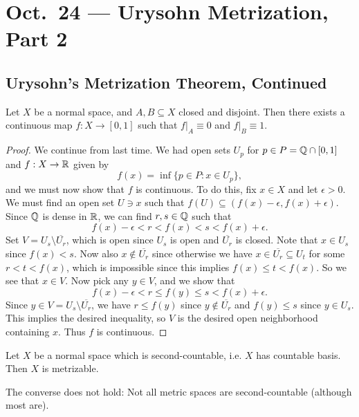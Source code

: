 \chapter{Oct.~24 --- Urysohn Metrization, Part 2}

\section{Urysohn's Metrization Theorem, Continued}
\begin{lemma}
  Let $X$ be a normal space, and $A, B \subseteq X$
  closed and disjoint. Then there exists
  a continuous map $f : X \to [0, 1]$ such that
  $f|_A \equiv 0$ and $f|_B \equiv 1$.
\end{lemma}

\begin{proof}
  We continue from last time. We had
  open sets $U_p$ for $p \in P = \mathbb{Q} \cap [0, 1]$ and
  $f : X \to \mathbb{R}$ given by
  \[
    f(x)  = \inf\{p \in P : x \in U_p\},
  \]
  and we must now show that $f$ is continuous. To
  do this, fix $x \in X$ and let $\epsilon > 0$. We
  must find an open set $U \ni x$ such that
  $f(U) \subseteq (f(x) - \epsilon, f(x) + \epsilon)$.
  Since $\mathbb{Q}$ is dense in $\mathbb{R}$, we can find
  $r, s \in \mathbb{Q}$ such that
  \[
    f(x) - \epsilon < r < f(x) < s < f(x) + \epsilon.
  \]
  Set $V = U_s \setminus \overline{U_r}$, which
  is open since $U_s$ is open and
  $\overline{U_r}$ is closed. Note that $x \in U_s$
  since $f(x) < s$. Now also
  $x \notin \overline{U_r}$ since otherwise we have
  $x \in \overline{U_r} \subseteq U_t$ for some
  $r < t < f(x)$, which is impossible since this
  implies $f(x) \le t < f(x)$. So we see that
  $x \in V$. Now pick any $y \in V$, and we show that
  \[
    f(x) - \epsilon < r \le f(y) \le s < f(x) + \epsilon.
  \]
  Since $y \in V = U_s \setminus \overline{U_r}$,
  we have $r \le f(y)$ since $y \notin \overline{U_r}$
  and $f(y) \le s$ since $y \in U_s$. This
  implies the desired inequality, so $V$ is
  the desired open neighborhood containing $x$. Thus
  $f$ is continuous.
\end{proof}

\begin{theorem}
  Let $X$ be a normal space which is
  second-countable, i.e. $X$ has countable basis.
  Then $X$ is metrizable.
\end{theorem}

\begin{remark}
  The converse does not hold: Not all metric spaces
  are second-countable (although most are).
\end{remark}

